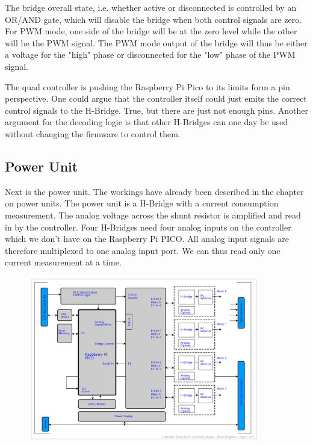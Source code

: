 The bridge overall state, i.e. whether active or disconnected is controlled by an OR/AND gate, which will disable the bridge when both control signals are zero. For PWM mode, one side of the bridge will be at the zero level while the other will be the PWM signal. The PWM mode output of the bridge will thus be either a voltage for the "high" phase or disconnected for the "low" phase of the PWM signal.

The quad controller is pushing the Raspberry Pi Pico to its limits form a pin perspective. One could argue that the controller itself could just emits the correct control signals to the H-Bridge. True, but there are just not enough pins. Another argument for the decoding logic is that other H-Bridges can one day be used without changing the firmware to control them. 

\subsection{Power Unit}

Next is the power unit. The workings have already been described in the chapter on power units. The power unit is a H-Bridge with a current consumption measurement. The analog voltage across the shunt resistor is amplified and read in by the controller. Four H-Bridges need four analog inputs on the controller which we don't have on the Raspberry Pi PICO. All analog input signals are therefore multiplexed to one analog input port. We can thus read only one current measurement at a time.

\begin{figure}[htbp]
    \centering
    \includegraphics[page=4, width=0.9\textwidth]{./Schematics/Schematic_LcsNodes-Quad-Block-Controller.pdf}
\end{figure}
\FloatBarrier

